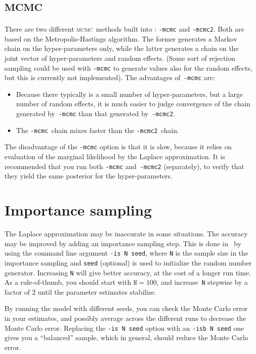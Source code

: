 \documentclass{admbmanual}
\newcommand{\scMCMC}{\textsc{mcmc}}
\begin{document}
\section{\scMCMC}

There are two different \scMCMC\ methods built into \scAR: \texttt{-mcmc} and \texttt{-mcmc2}. Both are based on the
Metropolis-Hastings algorithm. The former generates a Markov chain
on the hyper-parameters only, while the latter generates a chain on the joint vector of
hyper-parameters and random effects. (Some sort of rejection sampling could be used with \texttt{-mcmc} to generate values
also for the random effects, but this is currently not implemented). The advantages of~\texttt{-mcmc} are:
\begin{itemize}
\item Because there typically is a small number of hyper-parameters, but a large number of random effects, it is much
      easier to judge convergence of the chain generated by~\texttt{-mcmc} than that generated by~\texttt{-mcmc2}.
\item The \texttt{-mcmc}~chain mixes faster than the \texttt{-mcmc2}~chain.
\end{itemize}
The disadvantage of the \texttt{-mcmc} option is that it is slow, because it relies on evaluation of the
marginal likelihood by the Laplace approximation. It is recommended that you run  both \texttt{-mcmc} and~\texttt{-mcmc2} (separately),
to verify that they yield the same posterior for the hyper-parameters.


\section{Importance sampling}

The Laplace approximation may be inaccurate in some situations.
The accuracy may be improved by adding an importance sampling step. 
This is done in \scAR\ by using the command line argument \texttt{-is N seed}, where \texttt{N} 
is the sample size in the importance sampling and \texttt{seed} (optional) is used to 
initialize the random number generator. Increasing \texttt{N} will give better accuracy, at the cost 
of a longer run time. As a rule-of-thumb, you should start with $\texttt{N}=100$, 
and increase~\texttt{N} stepwise by a factor of 2 until the parameter estimates stabilize.

By running the model with different seeds, you can check the Monte Carlo error in your estimates, and possibly
average across the different runs to decrease the Monte Carlo error.
Replacing the \texttt{-is N seed} option with an \texttt{-isb N seed} one gives you a ``balanced''
sample, which in general, should reduce the Monte Carlo error.
\end{document}
